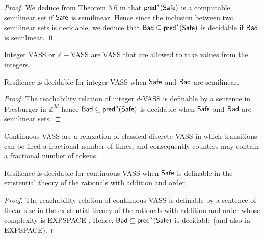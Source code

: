 \begin{proof}
We deduce from Theorem 3.6 in \cite{DBLP:conf/rp/Schnoebelen10} that $\textsf{pred}^*(\textsf{Safe})$ is a computable semilinear set if $\textsf{Safe}$ is semilinear. Hence since the inclusion between two semilinear sets is decidable, we deduce that $\textsf{Bad} \subseteq \textsf{pred}^*(\textsf{Safe})$ is decidable if $\textsf{Bad}$ is semilinear. \qed
\end{proof}

Integer VASS or $\mathbb{Z}-$VASS \cite{DBLP:conf/rp/HaaseH14} are VASS that are allowed to take values from the integers.

\begin{theorem}\label{SL int-VASS}
{\sc Resilience} is decidable for integer VASS when $\textsf{Safe}$ and $\textsf{Bad}$ are semilinear.
\end{theorem}

\begin{proof}
The reachability relation of integer $d$-VASS is definable by a sentence in Presburger in $\mathbb{Z}^{2d}$ hence	$\textsf{Bad} \subseteq \textsf{pred}^*(\textsf{Safe})$ is decidable when $\textsf{Safe}$ and $\textsf{Bad}$ are semilinear sets.
\end{proof}

Continuous VASS \cite{DBLP:journals/tocl/BlondinFHH17} are a relaxation of classical discrete VASS in which transitions can be fired a fractional number of times, and consequently counters may contain a fractional number of tokens.

\begin{theorem}\label{RP VASS}
{\sc Resilience} is decidable for continuous VASS when $\textsf{Safe}$ 
is
definable in the existential theory of the rationals with addition and order.
\end{theorem}

\begin{proof}
The reachability relation of continuous VASS is definable by a sentence of linear size in the existential theory of
the rationals with addition and order whose complexity is EXPSPACE \cite{DBLP:journals/tocl/BlondinFHH17}. Hence, $\textsf{Bad} \subseteq \textsf{pred}^*(\textsf{Safe})$ is decidable (and also in EXPSPACE). 
\end{proof}


